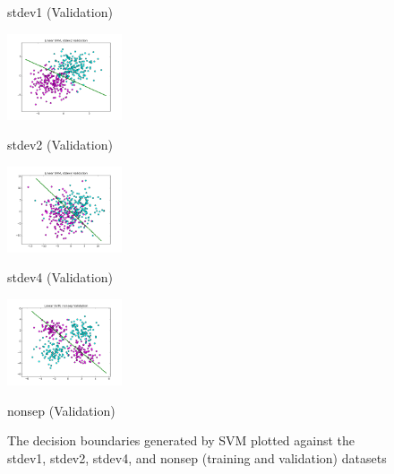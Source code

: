 \documentclass[10pt]{article}
\begin{document}
\begin{figure}[ht]
\begin{minipage}[b]{.24\linewidth}
		\caption*{stdev1 (Validation)}
	\end{minipage}
	\begin{minipage}[b]{.24\linewidth}
		\includegraphics[width=1\linewidth, height=1in]{linear_svm_stdev2_validation.png}
		\caption*{stdev2 (Validation)}
	\end{minipage}
	\begin{minipage}[b]{.24\linewidth}
		\includegraphics[width=1\linewidth, height=1in]{linear_svm_stdev4_validation.png}
		\caption*{stdev4 (Validation)}
	\end{minipage}
	\begin{minipage}[b]{.24\linewidth}
		\includegraphics[width=1\linewidth, height=1in]{linear_svm_nonsep_validation.png}
		\caption*{nonsep (Validation)}
	\end{minipage}
	\caption{The decision boundaries generated by SVM plotted against the stdev1, stdev2, stdev4, and nonsep (training and validation) datasets}
\end{figure}
\end{document}

